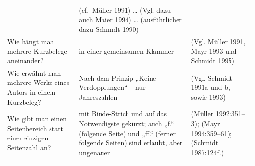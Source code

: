 \documentclass[]{book}
\theoremstyle{definition}
\theoremstyle{definition}
\theoremstyle{definition}
\theoremstyle{remark}
\begin{document}
\begin{longtable}[]{@{}lll@{}}
\begin{minipage}[t]{0.37\columnwidth}
\end{minipage} & \begin{minipage}[t]{0.36\columnwidth}\raggedright\strut
(cf.~Müller 1991) \ldots{} (Vgl. dazu auch Maier 1994) \ldots{}
(ausführlicher dazu Schmidt 1990) \vspace{-6mm}\strut
\end{minipage}\tabularnewline
\begin{minipage}[t]{0.18\columnwidth}\raggedright\strut
Wie hängt man mehrere Kurzbelege aneinander?\strut
\end{minipage} & \begin{minipage}[t]{0.37\columnwidth}\raggedright\strut
in einer gemeinsamen Klammer\strut
\end{minipage} & \begin{minipage}[t]{0.36\columnwidth}\raggedright\strut
(Vgl. Müller 1991, Mayr 1993 und Schmidt 1995) \vspace{-6mm}\strut
\end{minipage}\tabularnewline
\begin{minipage}[t]{0.18\columnwidth}\raggedright\strut
Wie erwähnt man mehrere Werke eines Autors in einem Kurzbeleg?\strut
\end{minipage} & \begin{minipage}[t]{0.37\columnwidth}\raggedright\strut
Nach dem Prinzip „Keine Verdopplungen`` -- nur Jahreszahlen\strut
\end{minipage} & \begin{minipage}[t]{0.36\columnwidth}\raggedright\strut
(Vgl. Schmidt 1991a und b, sowie 1993) \vspace{-6mm}\strut
\end{minipage}\tabularnewline
\begin{minipage}[t]{0.18\columnwidth}\raggedright\strut
Wie gibt man einen Seitenbereich statt einer einzigen Seitenzahl
an?\strut
\end{minipage} & \begin{minipage}[t]{0.37\columnwidth}\raggedright\strut
mit Binde-Strich und auf das Notwendigste gekürzt; auch „f.`` (folgende
Seite) und „ff.`` (ferner folgende Seiten) sind erlaubt, aber
ungenauer\strut
\end{minipage} & \begin{minipage}[t]{0.36\columnwidth}\raggedright\strut
(Müller 1992:351--3); (Mayr 1994:359--61); (Schmidt 1987:124f.)
\vspace{-6mm}\strut
\end{minipage}\tabularnewline
\begin{minipage}[t]{0.18\columnwidth}\raggedright\strut

\end{minipage}
\end{longtable}
\end{document}
